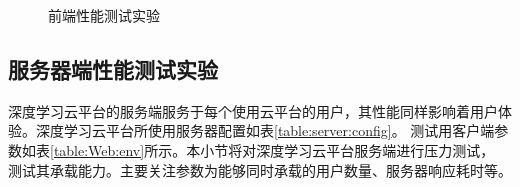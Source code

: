 \begin{figure}[t]
    \centering
    \caption{前端性能测试实验}
    \label{fig:web:test}
\end{figure}


\subsection{服务器端性能测试实验}

深度学习云平台的服务端服务于每个使用云平台的用户，其性能同样影响着用户体验。深度学习云平台所使用服务器配置如表\ref{table:server:config}。
测试用客户端参数如表\ref{table:Web:env}所示。本小节将对深度学习云平台服务端进行压力测试，
测试其承载能力。主要关注参数为能够同时承载的用户数量、服务器响应耗时等。

